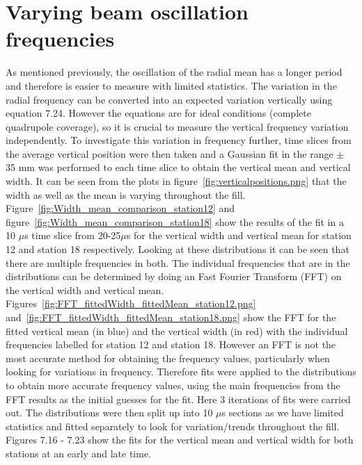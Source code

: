 \section{Varying beam oscillation frequencies}

As mentioned previously, the oscillation of the radial mean has a longer period and therefore is easier to measure with limited statistics. The variation in the radial frequency can be converted into an expected variation vertically using equation 7.24. However the equations are for ideal conditions (complete quadrupole coverage), so it is crucial to measure the vertical frequency variation independently. To investigate this variation in frequency further, time slices from the average vertical position were then taken and a Gaussian fit in the range $\pm$ 35 mm was performed to each time slice to obtain the vertical mean and vertical width. It can be seen from the plots in figure~\ref{fig:verticalpositions.png} that the width as well as the mean is varying throughout the fill. Figure~\ref{fig:Width_mean_comparison_station12} and figure~\ref{fig:Width_mean_comparison_station18} show the results of the fit in a 10 $\mu$s time slice from 20-25$\mu$s for the vertical width and vertical mean for station 12 and station 18 respectively. Looking at these distributions it can be seen that there are multiple frequencies in both. The individual frequencies that are in the distributions can be determined by doing an Fast Fourier Transform (FFT) on the vertical width and vertical mean. Figures~\ref{fig:FFT_fittedWidth_fittedMean_station12.png} and~\ref{fig:FFT_fittedWidth_fittedMean_station18.png} show the FFT for the fitted vertical mean (in blue) and the vertical width (in red) with the individual frequencies labelled for station 12 and station 18. However an FFT is not the most accurate method for obtaining the frequency values, particularly when looking for variations in frequency. Therefore fits were applied to the distributions to obtain more accurate frequency values, using the main frequencies from the FFT results as the initial guesses for the fit. Here 3 iterations of fits were carried out. The distributions were then split up into 10 $\mu$s sections 
as we have limited statistics and fitted separately to look for variation/trends throughout the fill. Figures 7.16 - 7.23 show the fits for the vertical mean and vertical width for both stations at an early and late time. 

